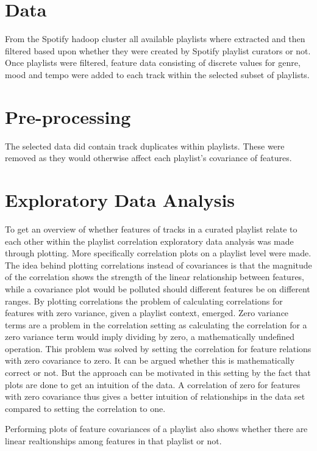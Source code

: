 \documentclass[a4paper,11pt]{kth-mag}
\begin{document}
\section{Data}
From the Spotify hadoop cluster all available playlists where extracted and then filtered based upon whether they were created by Spotify playlist curators or not. Once playlists were filtered, feature data consisting of discrete values for genre, mood and tempo were added to each track within the selected subset of playlists.

\section{Pre-processing}
The selected data did contain track duplicates within playlists. These were removed as they would otherwise affect each playlist's covariance of features.

\section{Exploratory Data Analysis}
To get an overview of whether features of tracks in a curated playlist relate to each other within the playlist correlation exploratory data analysis was made through plotting. More specifically correlation plots on a playlist level were made. The idea behind plotting correlations instead of covariances is that the magnitude of the correlation shows the strength of the linear relationship between features, while a covariance plot would be polluted should different features be on different ranges. By plotting correlations the problem of calculating correlations for features with zero variance, given a playlist context, emerged. Zero variance terms are a problem in the correlation setting as calculating the correlation for a zero variance term would imply dividing by zero, a mathematically undefined operation. This problem was solved by setting the correlation for feature relations with zero covariance to zero. It can be argued whether this is mathematically correct or not. But the approach can be motivated in this setting by the fact that plots are done to get an intuition of the data. A correlation of zero for features with zero covariance thus gives a better intuition of relationships in the data set compared to setting the correlation to one.

Performing plots of feature covariances of a playlist also shows whether there are linear realtionships among features in that playlist or not.
\end{document}
